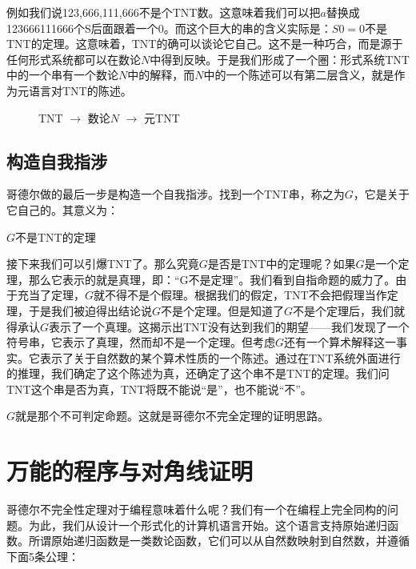 \documentclass{article}
\begin{document}
例如我们说123,666,111,666不是个TNT数。这意味着我们可以把$a$替换成123666111666个S后面跟着一个0。而这个巨大的串的含义实际是：$S0 = 0$不是TNT的定理。这意味着，TNT的确可以谈论它自己。这不是一种巧合，而是源于任何形式系统都可以在数论$N$中得到反映。于是我们形成了一个圈：形式系统TNT中的一个串有一个数论$N$中的解释，而$N$中的一个陈述可以有第二层含义，就是作为元语言对TNT的陈述。

\begin{figure}[htbp]
\centering
{}
\caption{TNT $\to$ 数论$N$ $\to$ 元TNT}
\label{fig:TNT-N-TNT}
\end{figure}

\subsection{构造自我指涉}

哥德尔做的最后一步是构造一个自我指涉。找到一个TNT串，称之为$G$，它是关于它自己的。其意义为：

\begin{center}
$G$不是TNT的定理
\end{center}

接下来我们可以引爆TNT了。那么究竟$G$是否是TNT中的定理呢？如果$G$是一个定理，那么它表示的就是真理，即：“G不是定理”。我们看到自指命题的威力了。由于充当了定理，$G$就不得不是个假理。根据我们的假定，TNT不会把假理当作定理，于是我们被迫得出结论说$G$不是个定理。但是知道了$G$不是个定理后，我们就得承认$G$表示了一个真理。这揭示出TNT没有达到我们的期望——我们发现了一个符号串，它表示了真理，然而却不是一个定理。但考虑$G$还有一个算术解释这一事实。它表示了关于自然数的某个算术性质的一个陈述。通过在TNT系统外面进行的推理，我们确定了这个陈述为真，还确定了这个串不是TNT的定理。我们问TNT这个串是否为真，TNT将既不能说“是”，也不能说“不”。

$G$就是那个不可判定命题。这就是哥德尔不完全定理的证明思路。

\section{万能的程序与对角线证明}
哥德尔不完全性定理对于编程意味着什么呢？我们有一个在编程上完全同构的问题。为此，我们从设计一个形式化的计算机语言开始。这个语言支持原始递归函数。所谓原始递归函数是一类数论函数，它们可以从自然数映射到自然数，并遵循下面5条公理：
\end{document}
